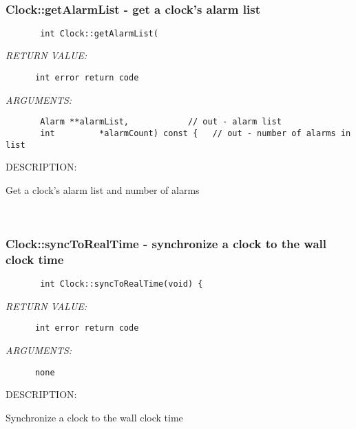  
\mbox{}\hrulefill\ 
 
\subsubsection [Clock::getAlarmList] {Clock::getAlarmList - get a clock's alarm list}


  
\begin{verbatim}       int Clock::getAlarmList(\end{verbatim}{\em RETURN VALUE:}
\begin{verbatim}      int error return code\end{verbatim}{\em ARGUMENTS:}
\begin{verbatim}       Alarm **alarmList,            // out - alarm list
       int         *alarmCount) const {   // out - number of alarms in list\end{verbatim}
{\sf DESCRIPTION:\\ }


       Get a clock's alarm list and number of alarms
   
 
\mbox{}\hrulefill\ 
 
\subsubsection [Clock::syncToRealTime] {Clock::syncToRealTime - synchronize a clock to the wall clock time}


  
\begin{verbatim}       int Clock::syncToRealTime(void) {\end{verbatim}{\em RETURN VALUE:}
\begin{verbatim}      int error return code\end{verbatim}{\em ARGUMENTS:}
\begin{verbatim}      none\end{verbatim}
{\sf DESCRIPTION:\\ }


      Synchronize a clock to the wall clock time
   
 
\mbox{}\hrulefill\ 
 
